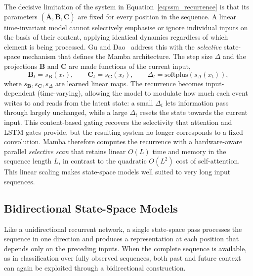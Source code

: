 \documentclass[%
    BCOR=10mm,
    DIV=13,
    toc=bibliography,
    toc=listof,
    oneside,
    12pt,
]{scrbook}
\begin{document}
The decisive limitation of the system in
Equation~\ref{eq:ssm_recurrence} is that its parameters
$(\overline{\mathbf{A}}, \overline{\mathbf{B}}, \mathbf{C})$ are fixed for
every position in the sequence. A linear time-invariant model cannot
selectively emphasise or ignore individual inputs on the basis of their
content, applying identical dynamics regardless of which element is being
processed. Gu and Dao~\cite{gu2023mamba} address this
with the \emph{selective} state-space mechanism that defines the Mamba
architecture. The step size $\Delta$ and the projections $\mathbf{B}$ and
$\mathbf{C}$ are made functions of the current input,
\begin{equation}
  \mathbf{B}_t = s_{\mathbf{B}}(x_t),
  \qquad
  \mathbf{C}_t = s_{\mathbf{C}}(x_t),
  \qquad
  \Delta_t = \mathrm{softplus}\!\left( s_{\Delta}(x_t) \right),
  \label{eq:mamba_selection}
\end{equation}
where $s_{\mathbf{B}}, s_{\mathbf{C}}, s_{\Delta}$ are learned linear maps. The
recurrence becomes input-dependent (time-varying), allowing the model to
modulate how much each event writes to and reads from the latent state: a
small $\Delta_t$ lets information pass through largely unchanged, while a large
$\Delta_t$ resets the state towards the current input. This content-based gating
recovers the selectivity that attention and LSTM gates provide, but the
resulting system no longer corresponds to a fixed convolution. Mamba therefore
computes the recurrence with a hardware-aware parallel \emph{selective scan}
that retains linear $O(L)$ time and memory in the sequence length $L$, in
contrast to the quadratic $O(L^2)$ cost of self-attention. This linear scaling
makes state-space models well suited to very long input sequences.

\subsection{Bidirectional State-Space Models}
\label{subsec:bimamba}

Like a unidirectional recurrent network, a single state-space pass processes
the sequence in one direction and produces a representation at each position
that depends only on the preceding inputs. When the complete sequence is
available, as in classification over fully observed sequences, both past and
future context can again be exploited through a bidirectional construction.
\end{document}
